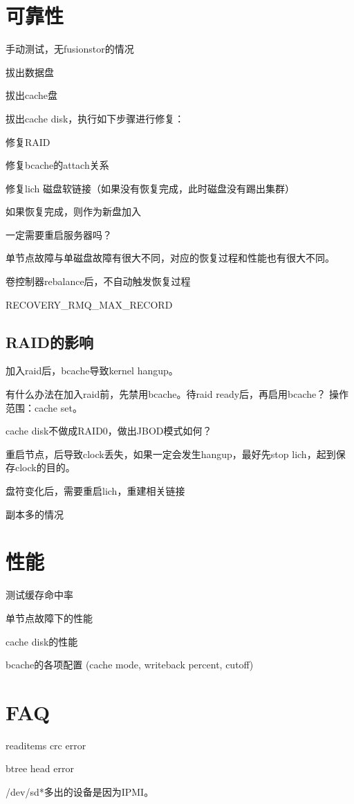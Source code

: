 \section{可靠性}

手动测试，无fusionstor的情况
\begin{enumbox}
\item 拔出数据盘
\item 拔出cache盘
\end{enumbox}

拔出cache disk，执行如下步骤进行修复：
\begin{enumbox}
\item 修复RAID
\item 修复bcache的attach关系
\item 修复lich 磁盘软链接（如果没有恢复完成，此时磁盘没有踢出集群）
\item 如果恢复完成，则作为新盘加入
\end{enumbox}

一定需要重启服务器吗？

单节点故障与单磁盘故障有很大不同，对应的恢复过程和性能也有很大不同。

卷控制器rebalance后，不自动触发恢复过程

RECOVERY\_RMQ\_MAX\_RECORD

\subsection{RAID的影响}


加入raid后，bcache导致kernel hangup。

有什么办法在加入raid前，先禁用bcache。待raid ready后，再启用bcache？
操作范围：cache set。

cache disk不做成RAID0，做出JBOD模式如何？

重启节点，后导致clock丢失，如果一定会发生hangup，最好先stop lich，起到保存clock的目的。

盘符变化后，需要重启lich，重建相关链接

副本多的情况

\section{性能}

测试缓存命中率

单节点故障下的性能
\begin{enumbox}
\item cache disk的性能
\item bcache的各项配置 (cache mode, writeback percent, cutoff)
\end{enumbox}

\section{FAQ}

readitems crc error

btree head error

/dev/sd*多出的设备是因为IPMI。
